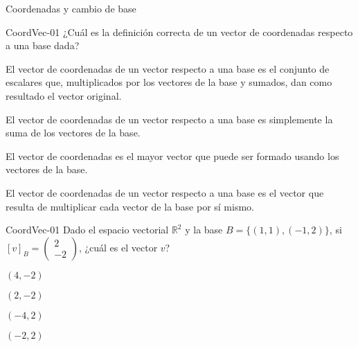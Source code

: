 \documentclass[a4,11pt]{aleph-notas}
\begin{document}
\begin{quiz}{Coordenadas y cambio de base}

\begin{multi}[]%
    {CoordVec-01}
    ¿Cuál es la definición correcta de un vector de coordenadas respecto a una base dada?
    \item* El vector de coordenadas de un vector respecto a una base es el conjunto de escalares que, multiplicados por los vectores de la base y sumados, dan como resultado el vector original.
    \item El vector de coordenadas de un vector respecto a una base es simplemente la suma de los vectores de la base.
    \item El vector de coordenadas es el mayor vector que puede ser formado usando los vectores de la base.
    \item El vector de coordenadas de un vector respecto a una base es el vector que resulta de multiplicar cada vector de la base por sí mismo.
\end{multi}


\begin{multi}[]%
    {CoordVec-01}
    Dado el espacio vectorial \( \mathbb{R}^2 \) y la base \( B = \{(1, 1), (-1, 2)\} \), si $[v]_B = \begin{pmatrix}2\\-2\end{pmatrix}$, ¿cuál es el vector $v$?
    \item* $(4, -2)$
    \item $(2,-2)$
    \item $(-4, 2)$
    \item $(-2,2)$
\end{multi}


\end{quiz}
\end{document}
